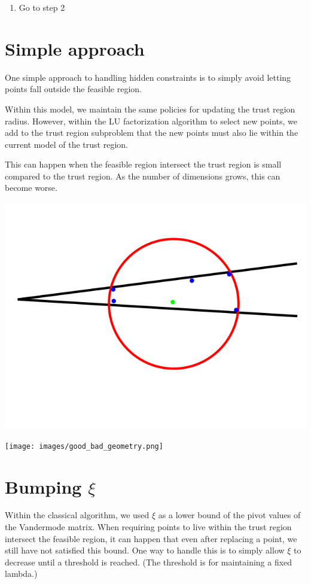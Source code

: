 \documentclass{article}
\begin{document}
\begin{enumerate}
	
	
	\item Go to step 2
\end{enumerate}






\section{Simple approach}
One simple approach to handling hidden constraints is to simply avoid letting points fall outside the feasible region.

Within this model, we maintain the same policies for updating the trust region radius.
However, within the LU factorization algorithm to select new points, we add to the trust region subproblem that the new points must also lie within the current model of the trust region.

This can happen when the feasible region intersect the trust region is small compared to the trust region.
As the number of dimensions grows, this can become worse.

\includegraphics[scale=0.4]{bad_lambda.png}


\texttt{[image: images/good\_bad\_geometry.png]}

\section{Bumping $\xi$}


Within the classical algorithm, we used $\xi$ as a lower bound of the pivot values of the Vandermode matrix.
When requiring points to live within the trust region intersect the feasible region, it can happen that even after replacing a point, we still have not satisfied this bound.
One way to handle this is to simply allow $\xi$ to decrease until a threshold is reached.
(The threshold is for maintaining a fixed lambda.)
\end{document}
